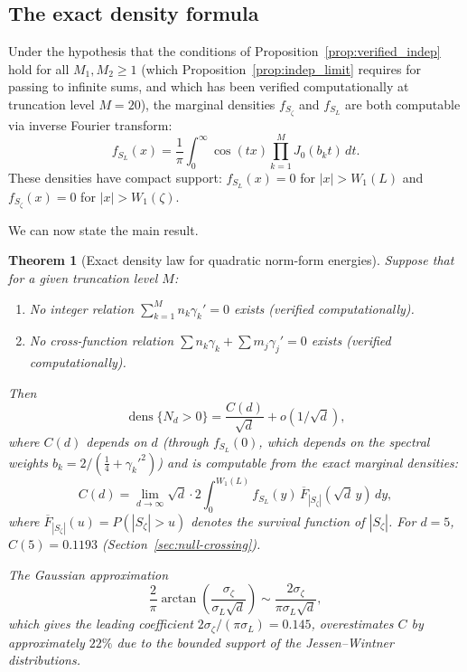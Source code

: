 \documentclass[12pt,reqno]{amsart}
\theoremstyle{plain}
\newtheorem{theorem}{Theorem}[section]
\theoremstyle{definition}
\theoremstyle{remark}
\DeclareMathOperator{\dens}{dens}
\begin{document}
\subsection{The exact density formula}

Under the hypothesis that the conditions of Proposition~\ref{prop:verified_indep} hold for all $M_1, M_2 \geq 1$ (which Proposition~\ref{prop:indep_limit} requires for passing to infinite sums, and which has been verified computationally at truncation level $M = 20$), the marginal densities $f_{S_\zeta}$ and $f_{S_L}$ are both computable via inverse Fourier transform:
\begin{equation}\label{eq:density_formula}
  f_{S_L}(x) = \frac{1}{\pi}\int_0^\infty \cos(tx)\prod_{k=1}^M J_0(b_k t)\, dt.
\end{equation}
These densities have compact support: $f_{S_L}(x) = 0$ for $|x| > W_1(L)$ and $f_{S_\zeta}(x) = 0$ for $|x| > W_1(\zeta)$.

We can now state the main result.

\begin{theorem}[Exact density law for quadratic norm-form energies]\label{thm:arctan}
Suppose that for a given truncation level $M$:
\begin{enumerate}[label=(\roman*)]
  \item No integer relation $\sum_{k=1}^M n_k\gamma_k' = 0$ exists (verified computationally).
  \item No cross-function relation $\sum n_k\gamma_k + \sum m_j\gamma_j' = 0$ exists (verified computationally).
\end{enumerate}
Then
\[
  \dens\{N_d > 0\} = \frac{C(d)}{\sqrt{d}} + o(1/\sqrt{d}),
\]
where $C(d)$ depends on $d$ (through $f_{S_L}(0)$, which depends on the spectral weights $b_k = 2/({\tfrac{1}{4}} + \gamma_k'^2)$) and is computable from the exact marginal densities:
\begin{equation}\label{eq:C_integral}
  C(d) = \lim_{d\to\infty}\sqrt{d}\cdot 2\int_0^{W_1(L)} f_{S_L}(y)\, \overline{F}_{|S_\zeta|}(\sqrt{d}\, y)\, dy,
\end{equation}
where $\overline{F}_{|S_\zeta|}(u) = P(|S_\zeta| > u)$ denotes the survival function of $|S_\zeta|$.  For $d = 5$, $C(5) = 0.1193$ (Section~\ref{sec:null-crossing}).

The Gaussian approximation
\[
  \frac{2}{\pi}\arctan\!\left(\frac{\sigma_\zeta}{\sigma_L\sqrt{d}}\right) \sim \frac{2\sigma_\zeta}{\pi\sigma_L\sqrt{d}},
\]
which gives the leading coefficient $2\sigma_\zeta/(\pi\sigma_L) = 0.145$, overestimates $C$ by approximately $22\%$ due to the bounded support of the Jessen--Wintner distributions.
\end{theorem}
\end{document}
